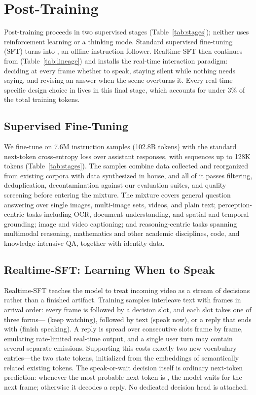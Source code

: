 \section{Post-Training}\label{sec:posttraining}

Post-training proceeds in two supervised stages (Table~\ref{tab:stages});
neither uses reinforcement learning or a thinking mode. Standard
supervised fine-tuning (SFT) turns \mossbase{} into \mossinstruct{}, an
offline instruction follower. Realtime-SFT then continues from
\mossinstruct{} (Table~\ref{tab:lineage}) and installs the real-time
interaction paradigm: deciding at every frame whether to speak, staying
silent while nothing needs saying, and revising an answer when the scene
overturns it. Every real-time-specific design choice in \mossvl{} lives
in this final stage, which accounts for under 3\% of the total training
tokens.

\subsection{Supervised Fine-Tuning}\label{sec:sft}

We fine-tune \mossbase{} on 7.6M instruction samples (102.8B tokens)
with the standard next-token cross-entropy loss over assistant
responses, with sequences up to 128K tokens (Table~\ref{tab:stages}).
The samples combine data collected and reorganized from existing
corpora with data synthesized in house, and all of it passes filtering,
deduplication, decontamination against our evaluation suites, and
quality screening before entering the mixture. The
mixture covers general question answering over single images,
multi-image sets, videos, and plain text; perception-centric tasks
including OCR, document understanding, and spatial and temporal
grounding; image and video captioning; and reasoning-centric tasks
spanning multimodal reasoning, mathematics and other academic
disciplines, code, and knowledge-intensive QA, together with identity
data.

\subsection{Realtime-SFT: Learning When to Speak}\label{sec:realtime-sft}

Realtime-SFT teaches the model to treat incoming video as a stream of
decisions rather than a finished artifact. Training samples interleave
text with frames in arrival order: every frame is followed by a decision
slot, and each slot takes one of three forms--- (keep
watching),  followed by text (speak now), or a reply
that ends with  (finish speaking). A reply is spread
over consecutive slots frame by frame, emulating rate-limited real-time
output, and a single user turn may contain several separate emissions.
Supporting this costs exactly two new vocabulary entries---the two state
tokens, initialized from the embeddings of semantically related existing
tokens. The speak-or-wait decision itself is ordinary next-token
prediction: whenever the most probable next token is ,
the model waits for the next frame; otherwise it decodes a reply. No
dedicated decision head is attached.

